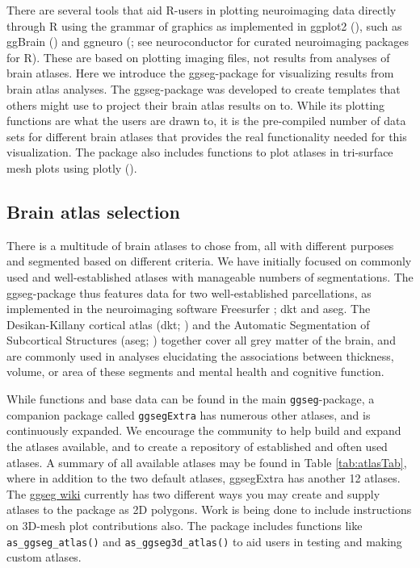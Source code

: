 \documentclass[fleqn,10pt]{wlpeerj} %
\begin{document}
There are several tools that aid R-users in plotting neuroimaging data directly through R using the grammar of graphics as implemented in ggplot2 (\citet{ggplot}), such as ggBrain (\citet{ggBrain}) and ggneuro (\citet{ggneuro}; see neuroconductor \citeyearpar{neuroconductor} for curated neuroimaging packages for R).
These are based on plotting imaging files, not results from analyses of brain atlases.
Here we introduce the ggseg-package for visualizing results from brain atlas analyses.
The ggseg-package was developed to create templates that others might use to project their brain atlas results on to.
While its plotting functions are what the users are drawn to, it is the pre-compiled number of data sets for different brain atlases that provides the real functionality needed for this visualization.
The package also includes functions to plot atlases in tri-surface mesh plots using plotly (\citet{plotly}).

\hypertarget{brain-atlas-selection}{%
\subsection{Brain atlas selection}\label{brain-atlas-selection}}

There is a multitude of brain atlases to chose from, all with different purposes and segmented based on different criteria.
We have initially focused on commonly used and well-established atlases with manageable numbers of segmentations.
The ggseg-package thus features data for two well-established parcellations, as implemented in the neuroimaging software Freesurfer \citep{fischl:99}; dkt and aseg.
The Desikan-Killany cortical atlas (dkt; \citet{dkt}) and the Automatic Segmentation of Subcortical Structures (aseg; \citet{aseg}) together cover all grey matter of the brain, and are commonly used in analyses elucidating the associations between thickness, volume, or area of these segments and mental health and cognitive function.

While functions and base data can be found in the main \texttt{ggseg}-package, a companion package called \texttt{ggsegExtra} has numerous other atlases, and is continuously expanded.
We encourage the community to help build and expand the atlases available, and to create a repository of established and often used atlases.
A summary of all available atlases may be found in Table \ref{tab:atlasTab}, where in addition to the two default atlases, ggsegExtra has another 12 atlases.
The \href{https://github.com/LCBC-UiO/ggseg/wiki}{ggseg wiki} currently has two different ways you may create and supply atlases to the package as 2D polygons.
Work is being done to include instructions on 3D-mesh plot contributions also.
The package includes functions like \texttt{as\_ggseg\_atlas()} and \texttt{as\_ggseg3d\_atlas()} to aid users in testing and making custom atlases.
\end{document}
